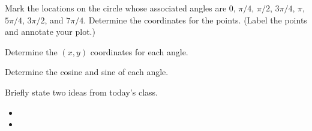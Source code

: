\begin{problem}
  \begin{subproblem}
  \item Mark the locations on the circle whose associated angles are
    0, $\pi/4$, $\pi/2$, $3\pi/4$, $\pi$, $5\pi/4$, $3\pi/2$, and
    $7\pi/4$.
    Determine the coordinates for the points.
    (Label the points and annotate your plot.)
    \clearpage

  \item Determine the $(x,y)$ coordinates for each angle.
    \vfill
  \item Determine the cosine and sine of each angle.
    \vfill
  \end{subproblem}

\end{problem}

\postClass

\begin{problem}
\item Briefly state two ideas from today's class.
  \begin{itemize}
  \item
  \item
  \end{itemize}
\item
  \begin{subproblem}
    \item
  \end{subproblem}
\end{problem}


